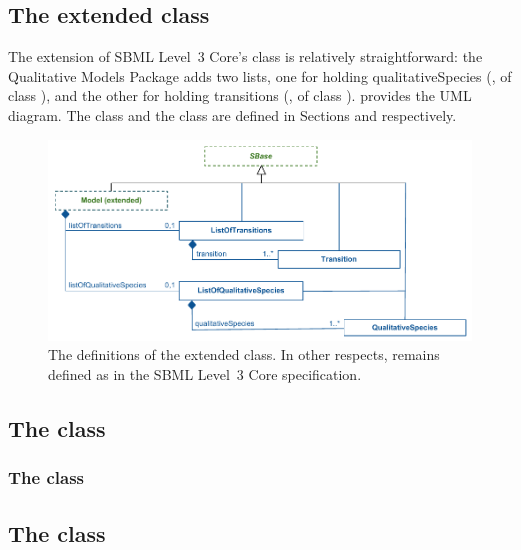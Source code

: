 \subsection{The extended  class}
\label{model-class}

The extension of SBML Level~3 Core's \Model class is relatively
straightforward: the Qualitative Models Package adds two lists,
one for holding qualitativeSpecies (, of class
\ListOfQualitativeSpecies), and the other for holding transitions (,
of class \ListOfTransitions).  \fig{} provides the UML
diagram.  The \QualitativeSpecies class and
the \Transition  class are defined in Sections  and  respectively.

\begin{figure}
  \includegraphics{figs/qual-extended-model-uml.pdf}
  \caption{The definitions of the extended \Model class. In other respects, \Model remains defined as
    in the SBML Level~3 Core specification.}
  \label{qual-extended-model-uml}
\end{figure}


\subsection{The  class}
\label{qualSpecies-class}

\subsubsection{The  class}

\subsection{The  class}
\label{transitions-class}

